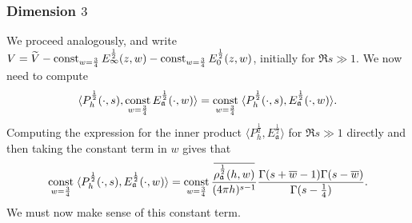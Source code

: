 \subsubsection*{Dimension $3$}



We proceed analogously, and write
$V = \widetilde{V} - \operatorname*{const}_{w = \frac{3}{4}} E_\infty^{\frac{1}{2}}(z, w) -
\operatorname*{const}_{w = \frac{3}{4}} E_0^{\frac{1}{2}} (z, w)$, initially for $\Re s \gg 1$.
We now need to compute
\begin{equation}
  \langle P_h^{\frac{1}{2}} (\cdot, s), \operatorname*{const}_{w = \frac{3}{4}}
  E_\mathfrak{a}^{\frac{1}{2}} (\cdot, w) \rangle
  =
  \operatorname*{const}_{w = \frac{3}{4}} \; \langle P_h^{\frac{1}{2}} (\cdot, s),
  E_\mathfrak{a}^{\frac{1}{2}} (\cdot, w) \rangle.
\end{equation}
Computing the expression for the inner product
$\langle P_h^{\frac{1}{2}} , E_\mathfrak{a}^{\frac{1}{2}}  \rangle$
for $\Re s \gg 1$ directly and then taking the constant term in $w$ gives that
\begin{equation}\label{eq:dim_3_constant_laurent}
  \operatorname*{const}_{w = \frac{3}{4}} \;
  \langle P_h^{\frac{1}{2}} (\cdot, s), E_\mathfrak{a}^{\frac{1}{2}} (\cdot, w) \rangle
  =
  \operatorname*{const}_{w = \frac{3}{4}}
  \frac{\overline{\rho_{\mathfrak{a}}^{\frac{1}{2}} (h,w)}}{(4\pi h)^{s-1}}
  \frac{\Gamma(s+\overline{w}-1)\Gamma(s-\overline{w})}{\Gamma(s - \frac{1}{4})}.
\end{equation}
We must now make sense of this constant term.



